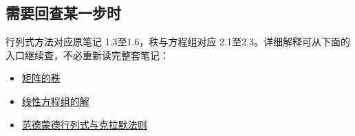 \documentclass[
  11pt,
  a4paper,
  fontset=fandol]{ctexart}
\providecommand{\tightlist}{%
  \setlength{\itemsep}{0pt}\setlength{\parskip}{0pt}}
\begin{document}

\subsection{需要回查某一步时}\label{ux9700ux8981ux56deux67e5ux67d0ux4e00ux6b65ux65f6}

行列式方法对应原笔记 1.3至1.6，秩与方程组对应
2.1至2.3。详细解释可从下面的入口继续查，不必重新读完整套笔记：

\begin{itemize}
\tightlist
\item
  \href{https://www.xy0v0.top/notes/higher-algebra/02-02-matrix-rank}{矩阵的秩}
\item
  \href{https://www.xy0v0.top/notes/higher-algebra/02-03-linear-systems}{线性方程组的解}
\item
  \href{https://www.xy0v0.top/notes/higher-algebra/01-06-cramers-rule-and-vandermonde-determinants}{范德蒙德行列式与克拉默法则}
\end{itemize}
\end{document}
